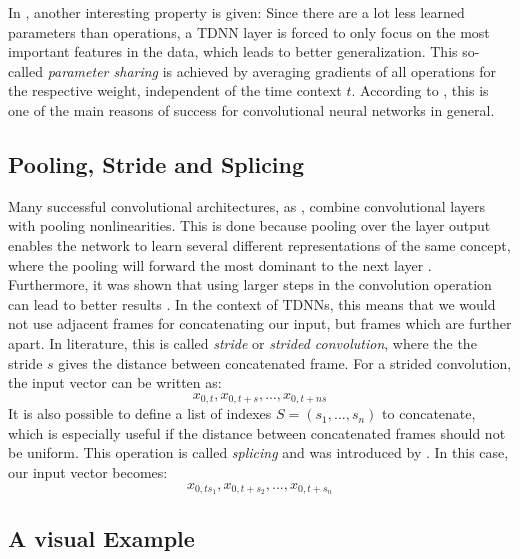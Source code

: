 In \cite{waibel1990phoneme}, another interesting property is given: Since there are a lot less learned parameters than operations, a TDNN layer is forced to only focus on the most important features in the data, which leads to better generalization. This so-called \textit{parameter sharing} is achieved by averaging gradients of all operations for the respective weight, independent of the time context $t$. According to \cite{Goodfellow-et-al-2016}, this is one of the main reasons of success for convolutional neural networks in general. 

\subsection{Pooling, Stride and Splicing}

Many successful convolutional architectures, as \cite{krizhevsky2012imagenet}, combine convolutional layers with pooling nonlinearities. This is done because pooling over the layer output enables the network to learn several different representations of the same concept, where the pooling will forward the most dominant to the next layer  \cite{Goodfellow-et-al-2016}. \\
Furthermore, it was shown that using larger steps in the convolution operation can lead to better results \cite{springenberg2014striving}. In the context of TDNNs, this means that we would not use adjacent frames for concatenating our input, but frames which are further apart. In literature, this is called \textit{stride} or \textit{strided convolution}, where the the stride $s$ gives the distance between concatenated frame. For a strided convolution, the input vector can be written as:
\[
x_{0,t}, x_{0,t + s}, ..., x_{0,t + ns}
\] 
It is also possible to define a list of indexes $S = (s_1, ..., s_n)$ to concatenate, which is especially useful if the distance between concatenated frames should not be uniform. This operation is called \textit{splicing} and was introduced by \cite{peddinti2015jhu}. In this case, our input vector becomes: 
\[
x_{0,ts_1}, x_{0,t + s_2}, ..., x_{0,t + s_n}
\] 

\subsection{A visual Example}

